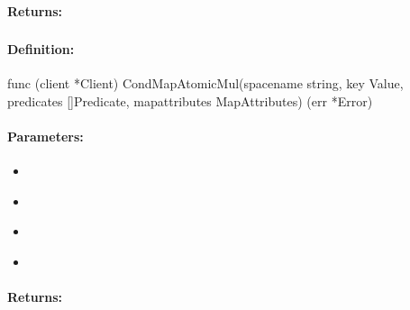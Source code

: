 \paragraph{Returns:}


\pagebreak
\subsubsection{}
\label{api:Go:CondMapAtomicMul}


\paragraph{Definition:}
\begin{gocode}
func (client *Client) CondMapAtomicMul(spacename string, key Value, predicates []Predicate, mapattributes MapAttributes) (err *Error)
\end{gocode}

\paragraph{Parameters:}
\begin{itemize}[noitemsep]
\item {}\\

\item {}\\

\item {}\\

\item {}\\

\end{itemize}

\paragraph{Returns:}


\pagebreak
\subsubsection{}
\label{api:Go:GroupMapAtomicMul}


